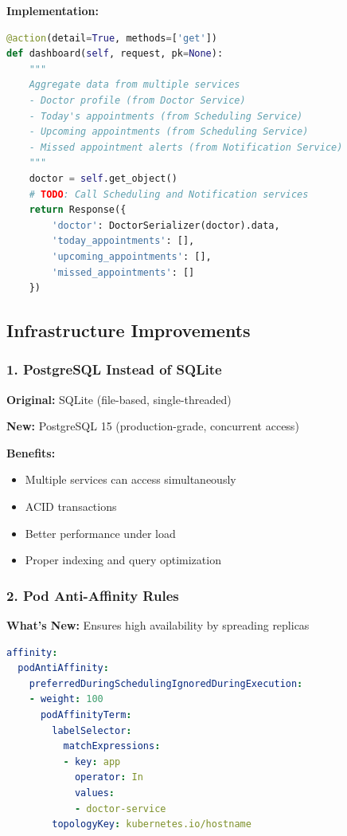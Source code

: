 \documentclass[12pt,a4paper]{article}
\begin{document}
\textbf{Implementation:}
\begin{lstlisting}[language=Python]
@action(detail=True, methods=['get'])
def dashboard(self, request, pk=None):
    """
    Aggregate data from multiple services
    - Doctor profile (from Doctor Service)
    - Today's appointments (from Scheduling Service)
    - Upcoming appointments (from Scheduling Service)
    - Missed appointment alerts (from Notification Service)
    """
    doctor = self.get_object()
    # TODO: Call Scheduling and Notification services
    return Response({
        'doctor': DoctorSerializer(doctor).data,
        'today_appointments': [],
        'upcoming_appointments': [],
        'missed_appointments': []
    })
\end{lstlisting}

\subsection{Infrastructure Improvements}

\subsubsection{1. PostgreSQL Instead of SQLite}
\textbf{Original:} SQLite (file-based, single-threaded)

\textbf{New:} PostgreSQL 15 (production-grade, concurrent access)

\textbf{Benefits:}
\begin{itemize}
    \item Multiple services can access simultaneously
    \item ACID transactions
    \item Better performance under load
    \item Proper indexing and query optimization
\end{itemize}

\subsubsection{2. Pod Anti-Affinity Rules}
\textbf{What's New:} Ensures high availability by spreading replicas

\begin{lstlisting}[language=yaml,caption={Pod Anti-Affinity Configuration}]
affinity:
  podAntiAffinity:
    preferredDuringSchedulingIgnoredDuringExecution:
    - weight: 100
      podAffinityTerm:
        labelSelector:
          matchExpressions:
          - key: app
            operator: In
            values:
            - doctor-service
        topologyKey: kubernetes.io/hostname
\end{lstlisting}
\end{document}
